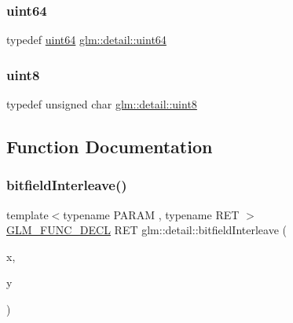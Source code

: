 \mbox{\label{namespaceglm_1_1detail_adec4b19bf4982125e122db2fe03c5810}} 
\subsubsection{\texorpdfstring{uint64}{uint64}}
{\footnotesize\ttfamily typedef \hyperlink{namespaceglm_1_1detail_adec4b19bf4982125e122db2fe03c5810}{uint64} \hyperlink{namespaceglm_1_1detail_adec4b19bf4982125e122db2fe03c5810}{glm\+::detail\+::uint64}}

\mbox{\label{namespaceglm_1_1detail_aef2588f97d090cc19fbbe0c74fe17c8f}} 
\subsubsection{\texorpdfstring{uint8}{uint8}}
{\footnotesize\ttfamily typedef unsigned char \hyperlink{namespaceglm_1_1detail_aef2588f97d090cc19fbbe0c74fe17c8f}{glm\+::detail\+::uint8}}



\subsection{Function Documentation}
\mbox{\label{namespaceglm_1_1detail_a39644ee418ae41e3393d1cb6191e32a7}} 
\subsubsection{\texorpdfstring{bitfield\+Interleave()}{bitfieldInterleave()}\hspace{0.1cm}{\footnotesize\ttfamily [1/11]}}
{\footnotesize\ttfamily template$<$typename P\+A\+R\+AM , typename R\+ET $>$ \\
\hyperlink{setup_8hpp_ab2d052de21a70539923e9bcbf6e83a51}{G\+L\+M\+\_\+\+F\+U\+N\+C\+\_\+\+D\+E\+CL} R\+ET glm\+::detail\+::bitfield\+Interleave (\begin{DoxyParamCaption}\item[{P\+A\+R\+AM}]{x,  }\item[{P\+A\+R\+AM}]{y }\end{DoxyParamCaption})}

